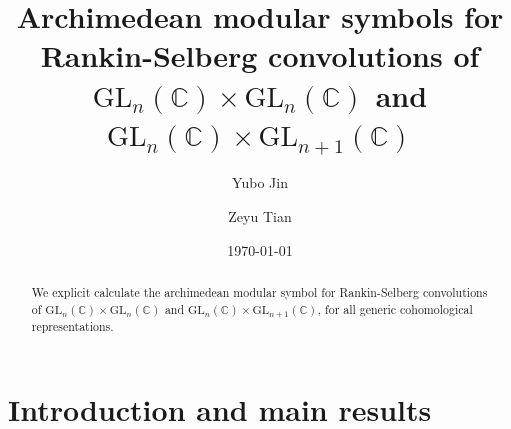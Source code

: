 \documentclass[12pt, a4paper]{amsart}
\newcommand{\GL}{{\mathrm{GL}}}
\newcommand{\C}{\mathbb{C}}
\theoremstyle{Theorem}
\theoremstyle{Theorem}
\theoremstyle{Theorem}
\theoremstyle{Theorem}
\theoremstyle{Plain}
\theoremstyle{Definition}
\begin{document}
	
	
	\title[Archimedean Modular Symbols]{Archimedean modular symbols for Rankin-Selberg convolutions of $\GL_n(\C)\times \GL_n(\C)$ and $\GL_n(\C)\times \GL_{n+1}(\C)$}
	
	\author[Y. Jin]{Yubo Jin}
	\address{Institute for Advanced Study in Mathematics, Zhejiang University\\
		Hangzhou, 310058, China}
	
	
	
	
	
	\author[Z. Tian]{Zeyu Tian}
	\address{School of Mathematical Sciences,  Zhejiang University\\
		Hangzhou, 310058, China}
	
	\date{\today}
	
	
	\maketitle
	
	\begin{abstract}
		We explicit calculate the archimedean modular symbol for Rankin-Selberg convolutions of $\GL_n(\C)\times\GL_n(\C)$ and $\GL_n(\C)\times\GL_{n+1}(\C)$, for all generic cohomological representations. 
	\end{abstract}
	
	\section{Introduction and main results}
	
\end{document}
